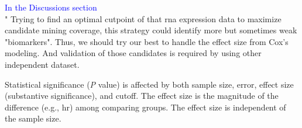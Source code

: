 \documentclass[preprint,12pt]{elsarticle}
\newenvironment{MyIndent}
{\par\leftskip1cm\relax\rightskip1cm\relax}
{\par\leftskip0cm\relax\rightskip0cm\relax}
\newenvironment{MyColorPar}[1]{%
    \leavevmode\color{#1}\ignorespaces%
}{%
}%
\begin{document}
\begin{MyColorPar}{blue}
\begin{MyIndent}
\begin{MyColorPar}{red}
\textcolor{blue}{In the Discussions section}\\
"
Trying to find an optimal cutpoint of that \acrshort{rna} expression data to maximize candidate mining coverage, this strategy could identify more but sometimes weak "biomarkers".
Thus, we should try our best to handle the effect size from Cox's modeling.
And validation of those candidates is required by using other independent dataset.

Statistical significance (\textit{P} value) is affected by both sample size, error, effect size (substantive significance)\cite{Sullivan2012}\cite{Thiese2016}, and cutoff. 
The effect size is the magnitude of the difference (e.g., \acrlong{hr}) among comparing groups.
The effect size is independent of the sample size\cite{Sullivan2012}.



\end{MyColorPar}
\end{MyIndent}
\end{MyColorPar}
\end{document}
